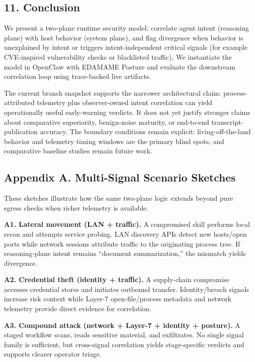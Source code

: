\documentclass[
]{article}
\begin{document}
\subsection{11. Conclusion}\label{conclusion}

We present a two-plane runtime security model: correlate agent intent
(reasoning plane) with host behavior (system plane), and flag divergence
when behavior is unexplained by intent or triggers intent-independent
critical signals (for example CVE-inspired vulnerability checks or
blacklisted traffic). We instantiate the model in OpenClaw with EDAMAME
Posture and evaluate the downstream correlation loop using trace-backed
live artifacts.

The current branch snapshot supports the narrower architectural claim:
process-attributed telemetry plus observer-owned intent correlation can
yield operationally useful early-warning verdicts. It does not yet
justify stronger claims about comparative superiority, benign-noise
maturity, or end-to-end transcript-publication accuracy. The boundary
conditions remain explicit: living-off-the-land behavior and telemetry
timing windows are the primary blind spots, and comparative baseline
studies remain future work.

\subsection{Appendix A. Multi-Signal Scenario
Sketches}\label{appendix-a.-multi-signal-scenario-sketches}

These sketches illustrate how the same two-plane logic extends beyond
pure egress checks when richer telemetry is available.

\textbf{A1. Lateral movement (LAN + traffic).} A compromised skill
performs local recon and attempts service probing. LAN discovery APIs
detect new hosts/open ports while network sessions attribute traffic to
the originating process tree. If reasoning-plane intent remains
``document summarization,'' the mismatch yields divergence.

\textbf{A2. Credential theft (identity + traffic).} A supply-chain
compromise accesses credential stores and initiates outbound transfer.
Identity/breach signals increase risk context while Layer-7
open-file/process metadata and network telemetry provide direct evidence
for correlation.

\textbf{A3. Compound attack (network + Layer-7 + identity + posture).} A
staged workflow scans, reads sensitive material, and exfiltrates. No
single signal family is sufficient, but cross-signal correlation yields
stage-specific verdicts and supports clearer operator triage.
\end{document}
